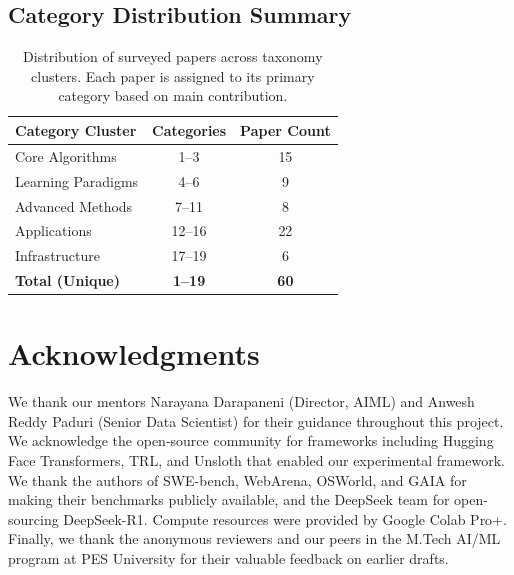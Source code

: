 \documentclass[12pt,a4paper]{report}
\theoremstyle{definition}
\begin{document}
\section*{Category Distribution Summary}

\begin{table}[htbp]
\centering
\begin{tabular}{|l|c|c|}
\hline
\textbf{Category Cluster} & \textbf{Categories} & \textbf{Paper Count} \\
\hline
Core Algorithms & 1--3 & 15 \\
Learning Paradigms & 4--6 & 9 \\
Advanced Methods & 7--11 & 8 \\
Applications & 12--16 & 22 \\
Infrastructure & 17--19 & 6 \\
\hline
\textbf{Total (Unique)} & \textbf{1--19} & \textbf{60} \\
\hline
\end{tabular}
\caption{Distribution of surveyed papers across taxonomy clusters. Each paper is assigned to its primary category based on main contribution.}
\label{tab:category_distribution}
\end{table}

\renewcommand{\bibname}{References}

\cleardoublepage{}
{}




\chapter*{Acknowledgments}

We thank our mentors Narayana Darapaneni (Director, AIML) and Anwesh Reddy Paduri (Senior Data Scientist) for their guidance throughout this project. We acknowledge the open-source community for frameworks including Hugging Face Transformers, TRL, and Unsloth that enabled our experimental framework. We thank the authors of SWE-bench, WebArena, OSWorld, and GAIA for making their benchmarks publicly available, and the DeepSeek team for open-sourcing DeepSeek-R1. Compute resources were provided by Google Colab Pro+. Finally, we thank the anonymous reviewers and our peers in the M.Tech AI/ML program at PES University for their valuable feedback on earlier drafts.
\end{document}
